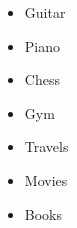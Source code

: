 \small
\begin{multicols}{2}
    \begin{itemize}
        \item  Guitar 
        \item  Piano 
        \item  Chess 
        \item  Gym 
        \item  Travels 
        \item  Movies 
        \item  Books 
\end{itemize}
\end{multicols}
